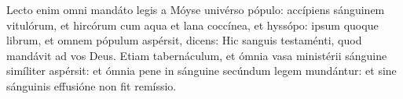 Lecto enim omni mandáto legis a Móyse univérso pópulo:
	accípiens sánguinem vitulórum, et hircórum cum aqua et lana coccínea, et hyssópo:
	ipsum quoque librum, et omnem pópulum aspérsit, dicens:
	Hic sanguis testaménti, quod mandávit ad vos Deus.
Etiam tabernáculum, et ómnia vasa ministérii sánguine simíliter aspérsit:
	et ómnia pene in sánguine secúndum legem mundántur:
	et sine sánguinis effusióne non fit remíssio.
